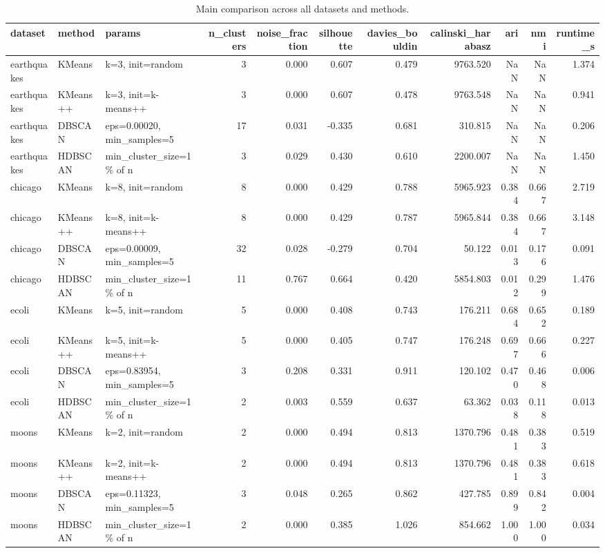 \begin{table}[t]
\caption{Main comparison across all datasets and methods.}
\label{tab:main}
\begin{tabular}{lllrrrrrrrr}
\toprule
dataset & method & params & n\_clusters & noise\_fraction & silhouette & davies\_bouldin & calinski\_harabasz & ari & nmi & runtime\_s \\
\midrule
earthquakes & KMeans & k=3, init=random & 3 & 0.000 & 0.607 & 0.479 & 9763.520 & NaN & NaN & 1.374 \\
earthquakes & KMeans++ & k=3, init=k-means++ & 3 & 0.000 & 0.607 & 0.478 & 9763.548 & NaN & NaN & 0.941 \\
earthquakes & DBSCAN & eps=0.00020, min\_samples=5 & 17 & 0.031 & -0.335 & 0.681 & 310.815 & NaN & NaN & 0.206 \\
earthquakes & HDBSCAN & min\_cluster\_size=1\% of n & 3 & 0.029 & 0.430 & 0.610 & 2200.007 & NaN & NaN & 1.450 \\
chicago & KMeans & k=8, init=random & 8 & 0.000 & 0.429 & 0.788 & 5965.923 & 0.384 & 0.667 & 2.719 \\
chicago & KMeans++ & k=8, init=k-means++ & 8 & 0.000 & 0.429 & 0.787 & 5965.844 & 0.384 & 0.667 & 3.148 \\
chicago & DBSCAN & eps=0.00009, min\_samples=5 & 32 & 0.028 & -0.279 & 0.704 & 50.122 & 0.013 & 0.176 & 0.091 \\
chicago & HDBSCAN & min\_cluster\_size=1\% of n & 11 & 0.767 & 0.664 & 0.420 & 5854.803 & 0.012 & 0.299 & 1.476 \\
ecoli & KMeans & k=5, init=random & 5 & 0.000 & 0.408 & 0.743 & 176.211 & 0.684 & 0.652 & 0.189 \\
ecoli & KMeans++ & k=5, init=k-means++ & 5 & 0.000 & 0.405 & 0.747 & 176.248 & 0.697 & 0.666 & 0.227 \\
ecoli & DBSCAN & eps=0.83954, min\_samples=5 & 3 & 0.208 & 0.331 & 0.911 & 120.102 & 0.470 & 0.468 & 0.006 \\
ecoli & HDBSCAN & min\_cluster\_size=1\% of n & 2 & 0.003 & 0.559 & 0.637 & 63.362 & 0.038 & 0.118 & 0.013 \\
moons & KMeans & k=2, init=random & 2 & 0.000 & 0.494 & 0.813 & 1370.796 & 0.481 & 0.383 & 0.519 \\
moons & KMeans++ & k=2, init=k-means++ & 2 & 0.000 & 0.494 & 0.813 & 1370.796 & 0.481 & 0.383 & 0.618 \\
moons & DBSCAN & eps=0.11323, min\_samples=5 & 3 & 0.048 & 0.265 & 0.862 & 427.785 & 0.899 & 0.842 & 0.004 \\
moons & HDBSCAN & min\_cluster\_size=1\% of n & 2 & 0.000 & 0.385 & 1.026 & 854.662 & 1.000 & 1.000 & 0.034 \\
\bottomrule
\end{tabular}
\end{table}
